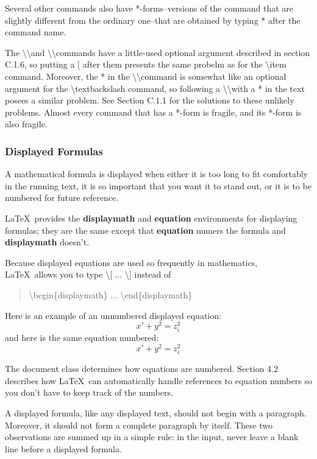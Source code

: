 \documentclass[twocolumn]{article}        %
\begin{document}
Several other commands also have *-forms--versions of the command that are slightly 
different from the ordinary one--that are obtained by typing * after the command name.

The \textbackslash \textbackslash and \textbackslash \textbackslash * commands have a little-used 
optional argument described in section C.1.6, so putting a [ after them presents the same probelm as 
for the \textbackslash item command. Moreover, the * in the \textbackslash \textbackslash * command 
is somewhat like an optional argument for the \textbackslash textbackslash command, so following a 
\textbackslash \textbackslash with a * in the text posees a similar problem. See Section C.1.1 for
the solutions to these unlikely problems. Almost every command that has a *-form is fragile, and its 
*-form is also fragile.

\subsubsection*{Displayed Formulas}

A mathematical formula is displayed when either it is too long to fit comfortably in the running text, 
it is so important that you want it to stand out, or it is to be numbered for future reference.

\LaTeX\ provides the \textbf{displaymath} and \textbf{equation} environments for displaying formulas;
they are the same except that \textbf{equation} numers the formula and \textbf{displaymath} doesn't.

Because displayed equations are used so frequently in mathematics, \LaTeX\ allows you to type 
\textbackslash [ ... \textbackslash ] instead of 

\begin{quote}
    \textbackslash begin\{displaymath\} ... \textbackslash end\{displaymath\}
\end{quote}

Here is an example of an unnumbered displayed equation:
\[ x' + y^{2} = z_{i}^{2} \] 
and here is the same equation numbered:
\begin{equation}
    x' + y^{2} = z_{i}^{2}
\end{equation}

The document class determines how equations are numbered. Section 4.2 describes how \LaTeX\ 
can automatically handle references to equation numbers so you don't have to keep track of
the numbers.

A displayed formula, like any displayed text, should not begin with a paragraph. Moreover, 
it should not form a complete paragraph by itself. These two observations are summed up in a
simple rule: in the input, never leave a blank line before a displayed formula.
\end{document}
